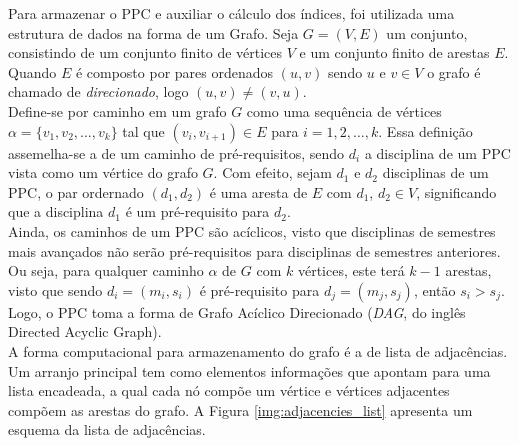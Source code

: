 \documentclass[a4paper, 12pt]{article}
\begin{document}
Para armazenar o PPC e auxiliar o cálculo dos índices, foi utilizada uma estrutura de dados na forma de um Grafo. Seja $G = (V, E)$ um conjunto, consistindo 
de um conjunto finito de vértices $V$ e um conjunto finito de arestas $E$. Quando $E$ é composto por pares ordenados $(u, v)$ sendo $u$ e $v \in V$ o grafo é 
chamado de \textit{direcionado}, logo $(u, v) \neq (v, u)$. \\

Define-se por caminho em um grafo $G$ como uma sequência de vértices $\alpha = \{ v_1, v_2, \dots, v_k \}$ tal que $(v_i, v_{i+1}) \in E$ para $i = 1, 2, \dots, k$.
Essa definição assemelha-se a de um caminho de pré-requisitos, sendo $d_i$ a disciplina de um PPC vista como um vértice do grafo $G$. Com efeito, sejam $d_1$ e 
$d_2$ disciplinas de um PPC, o par ordernado $(d_1, d_2)$ é uma aresta de $E$ com $d_1$, $d_2 \in V$, significando que a disciplina $d_1$ é um pré-requisito 
para $d_2$. \\

Ainda, os caminhos de um PPC são acíclicos, visto que disciplinas de semestres mais avançados não serão pré-requisitos para disciplinas de semestres 
anteriores. Ou seja, para qualquer caminho $\alpha$ de $G$ com $k$ vértices, este terá $k-1$ arestas, visto que sendo $d_i=(m_i, s_i)$ é pré-requisito para 
$d_j=(m_j, s_j)$, então $s_i > s_j$. Logo, o PPC toma a forma de Grafo Acíclico Direcionado (\textit{DAG}, do inglês Directed Acyclic Graph). \\

A forma computacional para armazenamento do grafo é a de lista de adjacências. Um arranjo principal tem como elementos informações que apontam para uma 
lista encadeada, a qual cada nó compõe um vértice e vértices adjacentes compõem as arestas do grafo. A Figura \ref{img:adjacencies_list} apresenta um 
esquema da lista de adjacências. 
\end{document}
